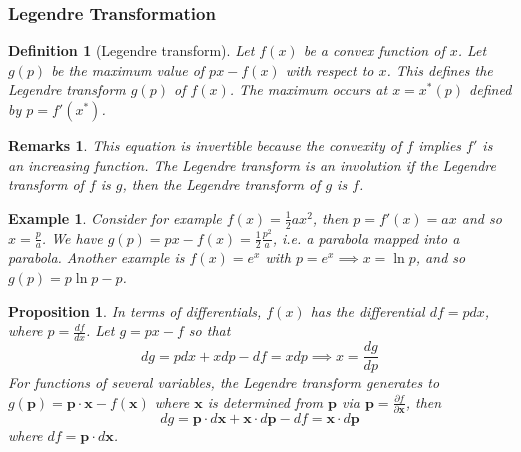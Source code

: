 \documentclass[a4paper]{article}
\newtheorem{remarks}{Remarks}[section]
\newtheorem{eg}{Example}[section]
\theoremstyle{new}
\newtheorem{defi}{Definition}[section]
\newtheorem{prop}{Proposition}[section]
\begin{document}
\subsubsection{Legendre Transformation}
\begin{defi}[Legendre transform]
Let $f(x)$ be a convex function of $x$. Let $g(p)$ be the maximum value of $px-f(x)$ with respect to $x$. This defines the Legendre transform $g(p)$ of $f(x)$. The maximum occurs at $x=x^*(p)$ defined by $p=f'(x^*)$. 
\end{defi}
\begin{remarks}
This equation is invertible because the convexity of $f$ implies $f'$ is an increasing function. The Legendre transform is an involution if the Legendre transform of $f$ is $g$, then the Legendre transform of $g$ is $f$.
\end{remarks}
\begin{eg}
Consider for example $f(x)=\frac{1}{2}ax^2$, then $p=f'(x)=ax$ and so $x=\frac{p}{a}$. We have $g(p)=px-f(x)=\frac{1}{2}\frac{p^2}{a}$, i.e. a parabola mapped into a parabola. Another example is $f(x)=e^x$ with $p=e^x\implies x=\ln p$, and so $g(p)=p\ln p-p$.
\end{eg}
\begin{prop}
In terms of differentials, $f(x)$ has the differential $df=pdx$, where $p=\frac{df}{dx}$. Let $g=px-f$ so that
$$dg=pdx+xdp-df=xdp\implies x=\frac{dg}{dp}$$
For functions of several variables, the Legendre transform generates to $g(\mathbf{p})=\mathbf{p}\cdot\mathbf{x}-f(\mathbf{x})$ where $\mathbf{x}$ is determined from $\mathbf{p}$ via $\mathbf{p}=\frac{\partial f}{\partial\mathbf{x}}$, then 
$$dg=\mathbf{p}\cdot d\mathbf{x}+\mathbf{x}\cdot d\mathbf{p}-df=\mathbf{x}\cdot d\mathbf{p}$$
where $df=\mathbf{p}\cdot d\mathbf{x}$. 
\end{prop}
\end{document}
